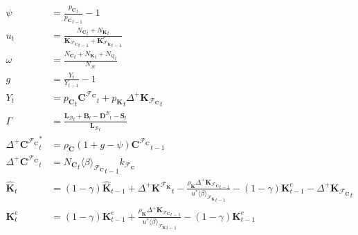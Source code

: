 \documentclass[a4paper, headings=standardclasses]{scrartcl}
\numberwithin{equation}{subsection}
\begin{document}
{\begin{align}
		\psi                                            & = \frac{{p_\mathbf{C}}_t}{{p_\mathbf{C}}_{t-1}} - 1 \\
		u_t                                               & = \frac{{N_\mathbf{C}}_t + {N_\mathbf{K}}_t}{{\mathbf{K}_{\mathcal{F}_\mathbf{C}}}_{t-1} + {\mathbf{K}_{\mathcal{F}_\mathbf{K}}^e}_{t-1}} \\
		\omega                                          & = \frac{{N_\mathbf{C}}_t + {N_\mathbf{K}}_t + {N_Q}_t}{N_\mathcal{H}}                                                                                                                                                                             \\
		g                                               & = \frac{Y_t}{Y_{t-1}} - 1                                                                                                                                                                                                                                                     \\
		Y_t                                               & = {p_\mathbf{C}}_t{\mathbf{C}^{\mathcal{F}_\mathbf{C}}}_t + {p_\mathbf{K}}_t {\Delta^+\mathbf{K}_{\mathcal{F}_\mathbf{C}}}_t     \\
		\Gamma                                          & = \frac{{\mathbf{L}_\mathcal{B}}_t + \mathbf{B}_t - {\mathbf{D}^\mathcal{B}}_t - \mathbf{S}_t}{{\mathbf{L}_\mathcal{B}}_t}            \\
		{\Delta^+\mathbf{C}^{\mathcal{F}_\mathbf{C}}}^*_t & = \rho_\mathbf{C} (1 + g - \psi) {\mathbf{C}^{\mathcal{F}_\mathbf{C}}}_{t-1}   \\
		{\Delta^+\mathbf{C}^{\mathcal{F}_\mathbf{C}}}_t   & = {N_\mathbf{C}}_t {\langle \beta \rangle_{\mathcal{F}_\mathbf{C}}}_{t-1} k_{\mathcal{F}_\mathbf{C}}  \\
		{\hat{\mathbf{K}}}_t                              & = (1-\gamma) \hat{\mathbf{K}}_{t-1} + {\Delta^+\mathbf{K}^{\mathcal{F}_\mathbf{K}}}_t - \frac{\rho_\mathbf{K} {\Delta^+\mathbf{K}_{\mathcal{F}_\mathbf{C}}}_{t-1}}{u^* {\langle \beta \rangle_{\mathcal{F}_\mathbf{K}}}_{t-1}} - (1-\gamma) \mathbf{K}^e_{t-1} - {\Delta^+\mathbf{K}_{\mathcal{F}_\mathbf{C}}}_t    \\
		{\mathbf{K}}^e_t                              & = (1-\gamma) \mathbf{K}^e_{t-1} + \frac{\rho_\mathbf{K} {\Delta^+\mathbf{K}_{\mathcal{F}_\mathbf{C}}}_{t-1}}{u^* {\langle \beta \rangle_{\mathcal{F}_\mathbf{K}}}_{t-1}} - (1-\gamma) \mathbf{K}^e_{t-1} \\

\end{align}}
\end{document}
